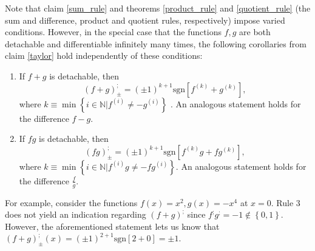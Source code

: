 \documentclass[11pt]{book}
\begin{document}
\begin{remark}Note that claim \ref{sum_rule} and theorems \ref{product_rule} and \ref{quotient_rule} (the sum and difference, product and quotient rules, respectively) impose varied conditions. However, in the special case that the functions $f,g$ are both detachable and differentiable infinitely many times, the following corollaries from claim \ref{taylor} hold independently of these conditions:

\begin{enumerate}
\item If $f+g$ is detachable, then $$\left(f+g\right)_{\pm}^{;}=\left(\pm1\right)^{k+1}\text{sgn}\left[f^{\left(k\right)}+g^{\left(k\right)}\right],$$ where $k\equiv\min\left\{ i\in\mathbb{N}|f^{\left(i\right)}\neq-g^{\left(i\right)}\right\}$ . An analogous statement holds for the difference $f-g$.
\item If $fg$ is detachable, then $$\left(fg\right)_{\pm}^{;}=\left(\pm1\right)^{k+1}\text{sgn}\left[f^{\left(k\right)}g+fg^{\left(k\right)}\right],$$ where $k\equiv\min\left\{ i\in\mathbb{N}|f^{\left(i\right)}g\neq-fg^{\left(i\right)}\right\}.$  An analogous statement holds for the difference $\frac{f}{g}$.
\end{enumerate}

For example, consider the functions $f\left(x\right)=x^{2},g\left(x\right)=-x^{4}$ at $x=0$. Rule 3 does not yield an indication regarding $\left(f+g\right)^{;}$ since $f^{;}g^{;}=-1\notin\left\{ 0,1\right\}$. However, the aforementioned statement lets us know that $\left(f+g\right)_{\pm}^{;}\left(x\right)=\left(\pm1\right)^{2+1}\text{sgn}\left[2+0\right]=\pm1$.
\end{remark}
\end{document}

